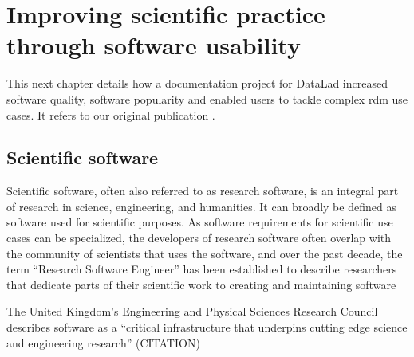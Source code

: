 

\chapter{Improving scientific practice through software usability}
\label{chap:k2}




This next chapter details how a documentation project for DataLad increased software quality, software popularity and enabled users to tackle complex \gls{rdm} use cases.
It refers to our original publication \citet{wagner2020datalad}.


\section{Scientific software}

Scientific software, often also referred to as research software, is an integral part of research in science, engineering, and humanities.
It can broadly be defined as software used for scientific purposes.
As software requirements for scientific use cases can be specialized, the developers of research software often overlap with the community of scientists that uses the software, and over the past decade, the term ``Research Software Engineer'' has been established to describe researchers that dedicate parts of their scientific work to creating and maintaining software \citep{hettrickRSE}



The United Kingdom's Engineering and Physical Sciences Research Council describes software as a ``critical infrastructure that underpins cutting edge science and engineering research'' (CITATION) %

